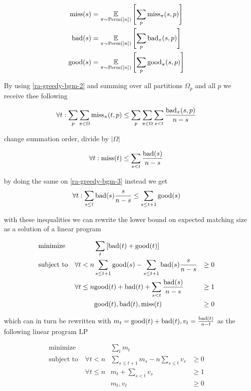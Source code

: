 \begin{align*}
	\mathrm{miss}(s)&=\underset{\pi\sim\mathrm{Perm}([n])}{\mathbb{E}}\left[\sum\limits_p\mathrm{miss}_\pi(s,p)\right]\\
	\mathrm{bad}(s)&=\underset{\pi\sim\mathrm{Perm}([n])}{\mathbb{E}}\left[\sum\limits_p\mathrm{bad}_\pi(s,p)\right]\\
	\mathrm{good}(s)&=\underset{\pi\sim\mathrm{Perm}([n])}{\mathbb{E}}\left[\sum\limits_p\mathrm{good}_\pi(s,p)\right]
\end{align*}

By using \autoref{ra-greedy-bgm-2} and summing over all partitions $\Omega_p$ and all $p$ we receive thee following

\[\forall t:\sum\limits_p\sum\limits_{\pi\in\Omega}\mathrm{miss}_\pi(t,p)\leq \sum\limits_p\sum\limits_{\pi\in\Omega}\sum\limits_{s<t}\frac{\mathrm{bad}_\pi(s,p)}{n-s}\]

change summation order, divide by $|\Omega|$

\[\forall t: \mathrm{miss}(t)\leq\sum\limits_{s<t}\frac{\mathrm{bad}(s)}{n-s}\]

by doing the same on \autoref{ra-greedy-bgm-3} instead we get
\[\forall t: \sum\limits_{s\leq t}\mathrm{bad}(s)\frac{s}{n-s}\leq\sum\limits_{s\leq t+1}\mathrm{good}(s)\]

with these inequalities we can rewrite the lower bound on expected matching size as a solution of a linear program

\begin{align*}
& \text{minimize}   &                 & \sum\limits_{t}\left[\mathrm{bad}(t)+\mathrm{good}(t)\right]                                 &\\
& \text{subject to} & \forall t<n     & \sum\limits_{s\leq t+1}\mathrm{good}(s) -\sum\limits_{s\leq t+1}\mathrm{bad}(s)\frac{s}{n-s} & \geq 0\\
&                   & \forall t\leq n & \mathrm{good}(t)+\mathrm{bad}(t)+\sum\limits_{s<t}\frac{\mathrm{bad}(s)}{n-s}                        &\geq 1\\
&                   &                 & \mathrm{good}(t),\mathrm{bad}(t),\mathrm{miss}(t)                                                    &\geq 0
\end{align*}

which can in turn be rewritten with $m_t=\mathrm{good}(t)+\mathrm{bad}(t),v_t=\frac{\mathrm{bad}(t)}{n-t}$ as the following linear program $\mathrm{LP}$

\begin{align*}
\text{minimize} & & \sum\limits_{t}m_t&\\
\text{subject to}\ & \forall t<n & \sum\limits_{s\leq t+1}m_s -n\sum\limits_{s\leq t}v_s & \geq 0\\
& \forall t\leq n & m_t+\sum\limits_{s<t}v_s&\geq 1\\
& & m_t,v_t&\geq 0
\end{align*}

